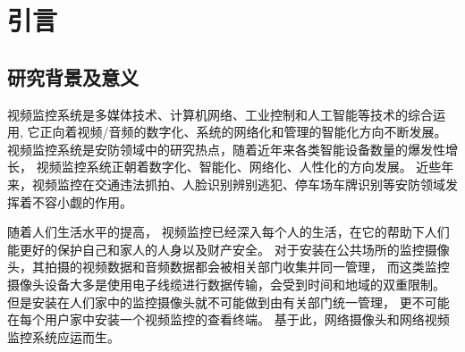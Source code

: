 \chapter{引言}
\section{研究背景及意义}
视频监控系统是多媒体技术、计算机网络、工业控制和人工智能等技术的综合运用,
它正向着视频/音频的数字化、系统的网络化和管理的智能化方向不断发展\cite{宋磊2003视频监控系统概述}。
视频监控系统是安防领域中的研究热点，随着近年来各类智能设备数量的爆发性增长，
视频监控系统正朝着数字化、智能化、网络化、人性化的方向发展\cite{索郎邓珠0实时视频监控系统的设计与实现}。
近些年来，视频监控在交通违法抓拍、人脸识别辨别逃犯、停车场车牌识别等安防领域发挥着不容小觑的作用。

随着人们生活水平的提高，
视频监控已经深入每个人的生活，在它的帮助下人们能更好的保护自己和家人的人身以及财产安全\cite{葛林0基于}。
对于安装在公共场所的监控摄像头，其拍摄的视频数据和音频数据都会被相关部门收集并同一管理，
而这类监控摄像头设备大多是使用电子线缆进行数据传输，会受到时间和地域的双重限制。
但是安装在人们家中的监控摄像头就不可能做到由有关部门统一管理，
更不可能在每个用户家中安装一个视频监控的查看终端。
基于此，网络摄像头和网络视频监控系统应运而生。




